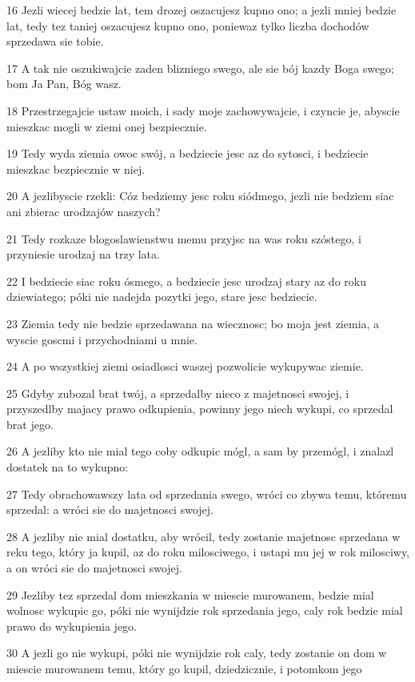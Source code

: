 \par 16 Jezli wiecej bedzie lat, tem drozej oszacujesz kupno ono; a jezli mniej bedzie lat, tedy tez taniej oszacujesz kupno ono, poniewaz tylko liczba dochodów sprzedawa sie tobie.
\par 17 A tak nie oszukiwajcie zaden blizniego swego, ale sie bój kazdy Boga swego; bom Ja Pan, Bóg wasz.
\par 18 Przestrzegajcie ustaw moich, i sady moje zachowywajcie, i czyncie je, abyscie mieszkac mogli w ziemi onej bezpiecznie.
\par 19 Tedy wyda ziemia owoc swój, a bedziecie jesc az do sytosci, i bedziecie mieszkac bezpiecznie w niej.
\par 20 A jezlibyscie rzekli: Cóz bedziemy jesc roku siódmego, jezli nie bedziem siac ani zbierac urodzajów naszych?
\par 21 Tedy rozkaze blogoslawienstwu memu przyjsc na was roku szóstego, i przyniesie urodzaj na trzy lata.
\par 22 I bedziecie siac roku ósmego, a bedziecie jesc urodzaj stary az do roku dziewiatego; póki nie nadejda pozytki jego, stare jesc bedziecie.
\par 23 Ziemia tedy nie bedzie sprzedawana na wiecznosc; bo moja jest ziemia, a wyscie goscmi i przychodniami u mnie.
\par 24 A po wszystkiej ziemi osiadlosci waszej pozwolicie wykupywac ziemie.
\par 25 Gdyby zubozal brat twój, a sprzedalby nieco z majetnosci swojej, i przyszedlby majacy prawo odkupienia, powinny jego niech wykupi, co sprzedal brat jego.
\par 26 A jezliby kto nie mial tego coby odkupic mógl, a sam by przemógl, i znalazl dostatek na to wykupno:
\par 27 Tedy obrachowawszy lata od sprzedania swego, wróci co zbywa temu, któremu sprzedal: a wróci sie do majetnosci swojej.
\par 28 A jezliby nie mial dostatku, aby wrócil, tedy zostanie majetnosc sprzedana w reku tego, który ja kupil, az do roku milosciwego, i ustapi mu jej w rok milosciwy, a on wróci sie do majetnosci swojej.
\par 29 Jezliby tez sprzedal dom mieszkania w miescie murowanem, bedzie mial wolnosc wykupic go, póki nie wynijdzie rok sprzedania jego, caly rok bedzie mial prawo do wykupienia jego.
\par 30 A jezli go nie wykupi, póki nie wynijdzie rok caly, tedy zostanie on dom w miescie murowanem temu, który go kupil, dziedzicznie, i potomkom jego
